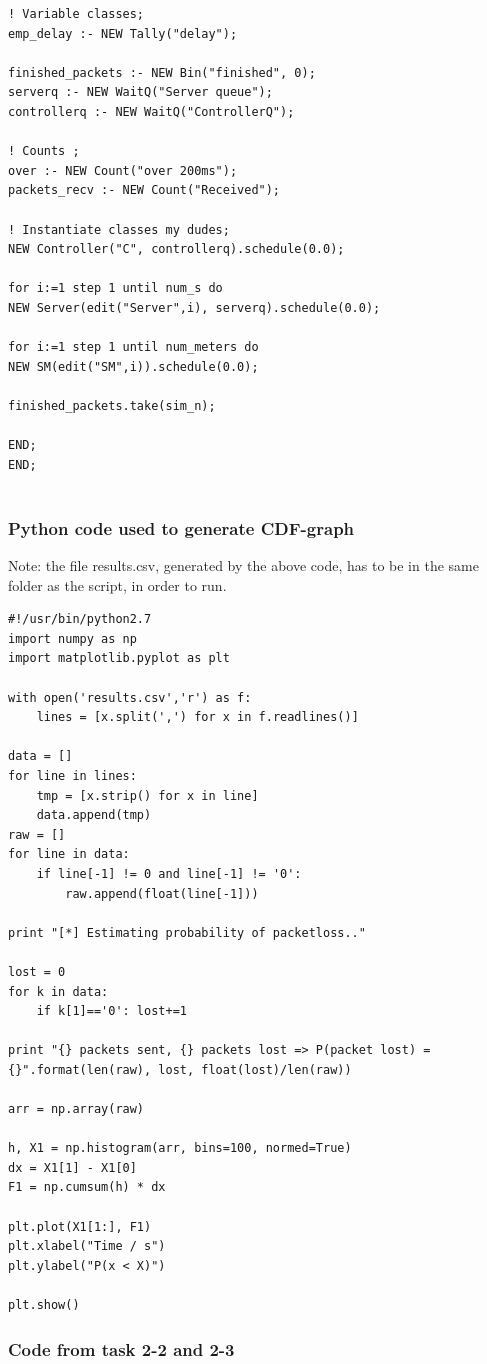 \documentclass[11pt]{article}
\begin{document}
\begin{lstlisting}
! Variable classes;
emp_delay :- NEW Tally("delay");

finished_packets :- NEW Bin("finished", 0);
serverq :- NEW WaitQ("Server queue"); 
controllerq :- NEW WaitQ("ControllerQ");

! Counts ;
over :- NEW Count("over 200ms");
packets_recv :- NEW Count("Received");

! Instantiate classes my dudes;
NEW Controller("C", controllerq).schedule(0.0);

for i:=1 step 1 until num_s do
NEW Server(edit("Server",i), serverq).schedule(0.0);

for i:=1 step 1 until num_meters do
NEW SM(edit("SM",i)).schedule(0.0);

finished_packets.take(sim_n);

END;
END;


\end{lstlisting}

\subsubsection{Python code used to generate CDF-graph}
Note: the file results.csv, generated by the above code, has to be in the same folder as the script, in order to run.
\begin{lstlisting}
#!/usr/bin/python2.7
import numpy as np
import matplotlib.pyplot as plt

with open('results.csv','r') as f:
	lines = [x.split(',') for x in f.readlines()]

data = []
for line in lines:
	tmp = [x.strip() for x in line]
	data.append(tmp)
raw = []
for line in data:
	if line[-1] != 0 and line[-1] != '0':
		raw.append(float(line[-1]))

print "[*] Estimating probability of packetloss.."

lost = 0
for k in data:
	if k[1]=='0': lost+=1

print "{} packets sent, {} packets lost => P(packet lost) = {}".format(len(raw), lost, float(lost)/len(raw))

arr = np.array(raw)

h, X1 = np.histogram(arr, bins=100, normed=True)
dx = X1[1] - X1[0]
F1 = np.cumsum(h) * dx

plt.plot(X1[1:], F1)
plt.xlabel("Time / s")
plt.ylabel("P(x < X)")

plt.show()
\end{lstlisting}

\subsubsection{Code from task 2-2 and 2-3}
\end{document}
